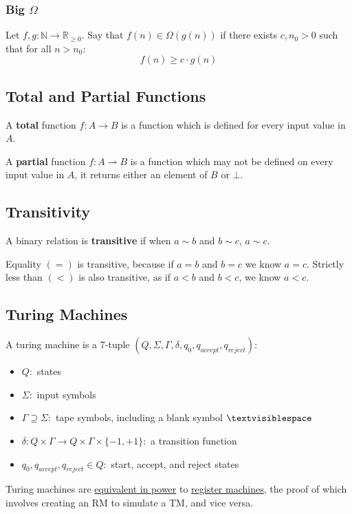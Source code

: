 \documentclass{article}
\begin{document}
\subsubsection{Big $\Omega$}
Let $f, g : \mathbb{N} \to \mathbb{R}_{\geq 0}$. Say that $f(n) \in \Omega(g(n))$ if there exists $c, n_0 > 0$ such that for all $n > n_0$:
\[f(n) \geq c \cdot g(n)\]


\subsection{Total and Partial Functions}\label{total-partial}
A \textbf{total} function $f : A \to B$ is a function which is defined for every input value in $A$.

A \textbf{partial} function $f : A \rightharpoonup B$ is a function which may not be defined on every input value in $A$, it returns either an element of $B$ or $\bot$.


\subsection{Transitivity}\label{transitive}
A binary relation is \textbf{transitive} if when $a \sim b$ and $b \sim c$, $a \sim c$.

Equality $(=)$ is transitive, because if $a = b$ and $b = c$ we know $a = c$. Strictly less than $(<)$ is also transitive, as if $a < b$ and $b < c$, we know $a < c$.


\subsection{Turing Machines}\label{tm}
A turing machine is a 7-tuple $(Q, \Sigma, \Gamma, \delta, q_0, q_{accept}, q_{reject})$:
\begin{itemize}
    \item $Q:$ states
    \item $\Sigma:$ input symbols
    \item $\Gamma \supseteq \Sigma:$ tape symbols, including a blank symbol $\textvisiblespace$
    \item $\delta: Q \times \Gamma \to Q \times \Gamma \times \{-1, +1\}:$ a transition function
    \item $q_0, q_{accept}, q_{reject} \in Q:$ start, accept, and reject states
\end{itemize}

Turing machines are \hyperref[church-turing]{equivalent in power} to \hyperref[rm]{register machines}, the proof of which involves creating an RM to simulate a TM, and vice versa.
\end{document}
